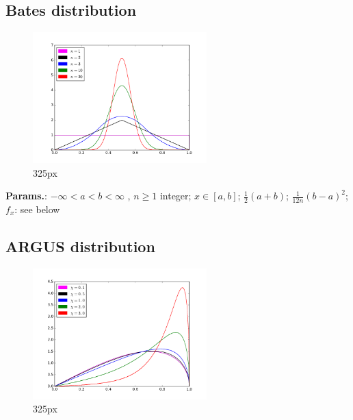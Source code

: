     
        
\subsection{Bates distribution}


    \begin{figure}[H]
        \centering
        \includegraphics[width=0.6\textwidth]{images/batesPDF.png}
        \caption{325px}
    \end{figure}




    {\color{darkblue} \textbf{Params.}:} {$-\infty < a < b < \infty $ ,  $ n \geq 1 $ integer}; {$x \in [a,b]$}; {$\tfrac{1}{2}(a+b)$}; {$\tfrac{1}{12n}(b-a)^2$};\hspace{0.5cm}\\{\color{darkblue} \textbf{$f_x$}:} {see below}



    
        
\subsection{ARGUS distribution}


    \begin{figure}[H]
        \centering
        \includegraphics[width=0.6\textwidth]{images/argusPDF.png}
        \caption{325px}
    \end{figure}




